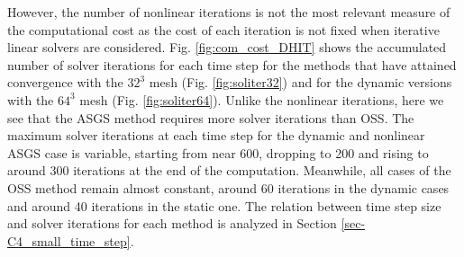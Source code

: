 However, the number of nonlinear iterations is not the most relevant measure of the computational cost as the cost of each iteration is not fixed when iterative linear solvers are considered. Fig. \ref{fig:com_cost_DHIT} shows the accumulated number of solver iterations for each time step for the methods that have attained convergence with the $32^3$ mesh (Fig. \ref{fig:soliter32}) and for the dynamic versions with the $64^3$ mesh (Fig. \ref{fig:soliter64}). 
Unlike the nonlinear iterations, here we see that the ASGS method requires more solver iterations than OSS. The maximum solver iterations at each time step for the dynamic and nonlinear ASGS case is variable, starting from near 600, dropping to 200 and rising to around 300 iterations at the end of the computation. Meanwhile, all cases of the OSS method remain almost constant, around 60 iterations in the dynamic cases and around 40 iterations in the static one. The relation between time step size and solver iterations for each method is analyzed in Section \ref{sec-C4_small_time_step}. %


